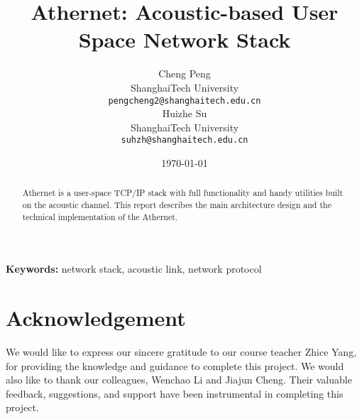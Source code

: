 \documentclass[10pt]{article}
\title{Athernet: Acoustic-based User Space Network Stack}
\author{
  Cheng Peng \\
   ShanghaiTech University   \\
  {\tt pengcheng2@shanghaitech.edu.cn} \\\And
 Huizhe Su \\
   ShanghaiTech University  \\
  {\tt suhzh@shanghaitech.edu.cn} \\}
\date{\today}
\begin{document}
\maketitle
\begin{abstract}
  Athernet is a user-space TCP/IP stack with full functionality and handy utilities built on the acoustic channel. This report describes the main architecture design and the technical implementation of the Athernet.
\end{abstract}

{\bf Keywords:} network stack, acoustic link, network protocol












\section*{Acknowledgement}
\lipsum[22]
We would like to express our sincere gratitude to our course teacher Zhice Yang, for providing the knowledge and guidance to complete this project. We would also like to thank our colleagues, Wenchao Li and Jiajun Cheng. Their valuable feedback, suggestions, and support have been instrumental in completing this project.
\end{document}
